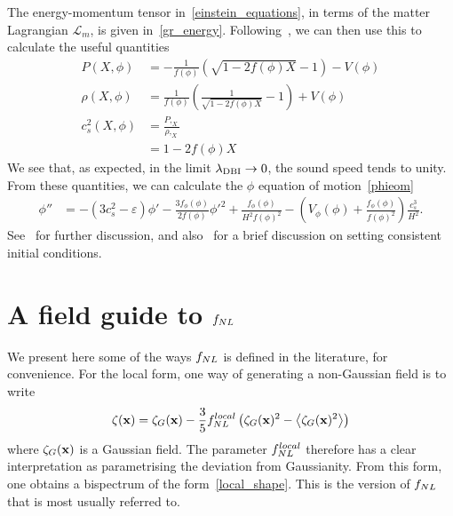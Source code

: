 The energy-momentum tensor in~\eqref{einstein_equations}, in terms of the matter Lagrangian $\mathcal{L}_m$,
is given in~\eqref{gr_energy}.
    Following~\cite{Christopherson_2009, mukhanov_1999},
    we can then use this to calculate the useful quantities
    \begin{align}
        P(X, \phi) &= -\frac{1}{f(\phi)}\left(\sqrt{1-2f(\phi)X}-1\right)-V(\phi)\\
        \rho(X, \phi) &= \frac{1}{f(\phi)}\left(\frac{1}{\sqrt{1-2f(\phi)X}}-1\right)+V(\phi)\\
        c^2_s(X, \phi) &= \frac{P,_X}{\rho,_X}\\
                    &= 1-2f(\phi)X
    \end{align}
    We see that, as expected, in the limit $\lambda_{\text{DBI}}\rightarrow 0$, the sound
    speed tends to unity.
    From these quantities, we can calculate the $\phi$ equation of motion~\eqref{phieom}
    \begin{align}
        \phi'' &= -(3c_s^2-\varepsilon)\phi'
                -\frac{3f_\phi(\phi)}{2f(\phi)}\phi'^2
                +\frac{f_\phi(\phi)}{H^2f(\phi)^2}
                -\left(V_\phi(\phi)+\frac{f_\phi(\phi)}{f(\phi)^2}\right)\frac{c_s^3}{H^2}.
    \end{align}
    See~\cite{dbi_silverstein, warp_features_dbi} for further discussion,
    and also~\cite{cmb_pol_ics} for a brief discussion on setting consistent initial conditions.


\section{A field guide to $f_{NL}$}
    We present here some of the ways
    $f_{NL}$ is defined in the literature, for convenience.
    For the local form, one way of generating a non-Gaussian field
    is to write
    \begin{align}\label{fnllocal_quadratic}
        \zeta(\mathbf{x}) = \zeta_G(\mathbf{x}) - \frac{3}{5}f^{local}_{NL}\left(\zeta_G(\mathbf{x})^2-\left<\zeta_G(\mathbf{x})^2\right>\right)
    \end{align}
    where $\zeta_G(\mathbf{x})$ is a Gaussian field. The parameter $f^{local}_{NL}$ therefore has a clear
    interpretation as parametrising the deviation from Gaussianity. From this form,
    one obtains a bispectrum of the form~\eqref{local_shape}. This is the version of $f_{NL}$
    that is most usually referred to.


